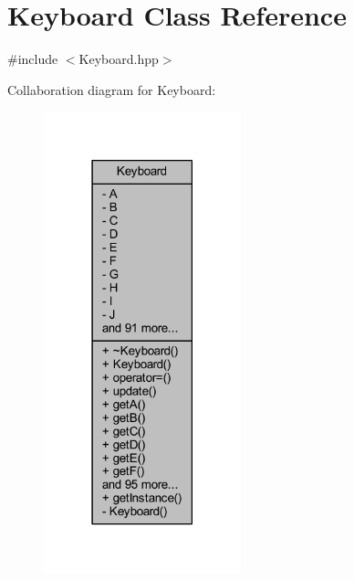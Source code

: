 \hypertarget{class_keyboard}{\section{Keyboard Class Reference}
\label{class_keyboard}
}


{\ttfamily \#include $<$Keyboard.\-hpp$>$}



Collaboration diagram for Keyboard\-:\nopagebreak
\begin{figure}[H]
\begin{center}
\leavevmode
\includegraphics[width=162pt]{class_keyboard__coll__graph}
\end{center}
\end{figure}
